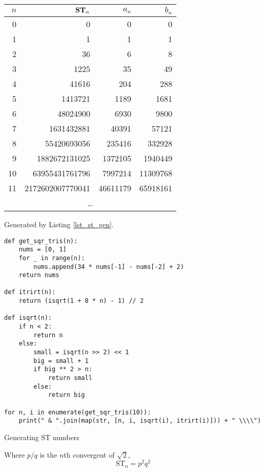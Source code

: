 \documentclass[fleqn,a4paper,11pt]{article}
\newenvironment{longlisting}
{\addvspace{\baselineskip}\captionsetup{type=listing}}
{\addvspace{\baselineskip}}
\begin{document}
    \begin{longtable}{rrrr}
    \toprule
    \boldmath\(n\) & \boldmath\(\text{\bfseries ST}_n\) & \boldmath\(a_n\) &
                   \boldmath\(b_n\) \\
    \midrule
    \endhead
    0 & 0 & 0 & 0 \\
    1 & 1 & 1 & 1 \\
    2 & 36 & 6 & 8 \\
    3 & 1225 & 35 & 49 \\
    4 & 41616 & 204 & 288 \\
    5 & 1413721 & 1189 & 1681 \\
    6 & 48024900 & 6930 & 9800 \\
    7 & 1631432881 & 40391 & 57121 \\
    8 & 55420693056 & 235416 & 332928 \\
    9 & 1882672131025 & 1372105 & 1940449 \\
    10 & 63955431761796 & 7997214 & 11309768 \\
    11 & 2172602007770041 & 46611179 & 65918161 \\
    \multicolumn{4}{c}{\dots} \\
    \bottomrule
    \end{longtable}

    Generated by Listing \ref{lst_st_gen}.

    \begin{longlisting}
    \begin{verbatim}
def get_sqr_tris(n):
    nums = [0, 1]
    for _ in range(n):
        nums.append(34 * nums[-1] - nums[-2] + 2)
    return nums

def itrirt(n):
    return (isqrt(1 + 8 * n) - 1) // 2

def isqrt(n):
    if n < 2:
        return n
    else:
        small = isqrt(n >> 2) << 1
        big = small + 1
        if big ** 2 > n:
            return small
        else:
            return big

for n, i in enumerate(get_sqr_tris(10)):
    print(" & ".join(map(str, [n, i, isqrt(i), itrirt(i)])) + " \\\\")
    \end{verbatim}
    \caption{Generating ST numbers}\label{lst_st_gen}
    \end{longlisting}


    Where \(p / q\) is the \(n\)th convergent of \(\sqrt 2\),
    \begin{equation}
    \mathrm{ST}_n = p^2 q^2
    \end{equation}
\end{document}
